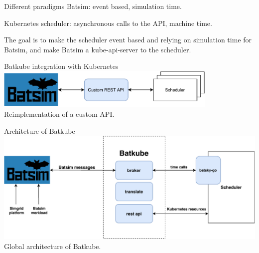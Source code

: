 \documentclass[12pt, aspectratio=43]{beamer}
\begin{document}
\begin{frame}{Different paradigms}
	Batsim: event based, simulation time.

	Kubernetes scheduler: asynchronous calls to the API, machine time.

	The goal is to make the scheduler event based and relying on simulation
	time for Batsim, and make Batsim a kube-api-server to the scheduler.
\end{frame}

\begin{frame}{Batkube integration with Kubernetes}
	\centering
	\includegraphics[width=0.8\textwidth]{../imgs/custom-api.pdf}\\
	\small{Reimplementation of a custom API.}
\end{frame}

\begin{frame}{Architeture of Batkube}
	\centering
	\includegraphics[width=\textwidth]{../imgs/batkube-architecture-3-synchro.pdf}
	\small{Global architecture of Batkube.}
\end{frame}

%
\end{document}
